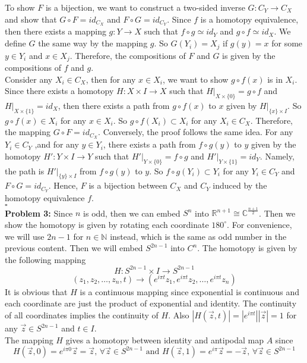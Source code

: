 \documentclass[12pt]{amsart}
\newcommand{\R}{\mathbb{R}}
\newcommand{\C}{\mathbb{C}}
\newcommand{\N}{\mathbb{N}}
\begin{document}
To show $F$ is a bijection, we want to construct a two-sided inverse $G:C_Y \rightarrow C_X$ and show that $G\circ F=id_{C_X}$ and $F\circ G=id_{C_Y}$. Since $f$ is a homotopy equivalence, then there exists a mapping $g:Y \rightarrow X$ such that $f\circ g\simeq id_Y$ and $g\circ f \simeq id_X$. We define $G$ the same way by the mapping $g$. So $G(Y_i)=X_j$ if $g(y)=x$ for some $y\in Y_i$ and $x\in X_j$. Therefore, the compositions of $F$ and $G$ is given by the compositions of $f$ and $g$. \\
Consider any $X_i\in C_X$, then for any $x\in X_i$, we want to show $g\circ f(x)$ is in $X_i$. Since there exists a homotopy $H:X\times I \rightarrow X$ such that $H|_{X\times \{0\}}=g\circ f$ and $H|_{X\times \{1\}}=id_X$, then there exists a path from $g\circ f(x)$ to $x$ given by $H|_{\{x\}\times I}$. So $g\circ f(x)\in X_i$ for any $x\in X_i$. So $g\circ f(X_i)\subset X_i$ for any $X_i\in C_X$. Therefore, the mapping $G\circ F=id_{C_X}$.
Conversely, the proof follows the same idea. For any $Y_i\in C_Y$ ,and for any $y\in Y_i$, there exists a path from $f\circ g(y)$ to $y$ given by the homotopy $H':Y\times I \rightarrow Y$ such that $H'|_{Y\times \{0\}}=f\circ g$ and $H'|_{Y\times \{1\}}=id_Y$. Namely, the path is $H'|_{\{y\}\times I}$ from $f\circ g(y)$ to $y$. So $f\circ g(Y_i)\subset Y_i$ for any $Y_i\in C_Y$ and $F\circ G=id_{C_Y}$. Hence, $F$ is a bijection between $C_X$ and $C_Y$ induced by the homotopy equivalence $f$.
\\\phantom{qed}\hfill$\square$\\
\textbf{Problem 3:} Since $n$ is odd, then we can embed $S^n$ into $\R^{n+1}\cong \C^{\frac{n+1}{2}}$. Then we show the homotopy is given by rotating each coordinate $180^\circ$. For convenience, we will use $2n-1$ for $n\in \N$ instead, which is the same as odd number in the previous content. Then we will embed $S^{2n-1}$ into $C^n$. The homotopy is given by
the following mapping
\[H:S^{2n-1}\times I \rightarrow S^{2n-1}\]
\[(z_1,z_2,\dots,z_n,t)\rightarrow (e^{i\pi t}z_1,e^{i\pi t}z_2,\dots,e^{i\pi t}z_n)\]
It is obvious that $H$ is a continuous mapping since exponential is continuous and each coordinate are just the product of exponential and identity. The continuity of all coordinates implies the continuity of $H$. Also $|H(\vec{z},t)|=|e^{i\pi t}||\vec{z}|=1$ for any $\vec{z}\in S^{2n-1}$ and $t\in I$.\\
The mapping $H$ gives a homotopy between identity and antipodal map $A$ since
\[H(\vec{z},0)=e^{i\pi 0}\vec{z}=\vec{z}\text{, $\forall \vec{z}\in S^{2n-1}$ and } H(\vec{z},1)=e^{i\pi}\vec{z}=-\vec{z} \text{, $\forall \vec{z}\in S^{2n-1}$}\]
\end{document}
